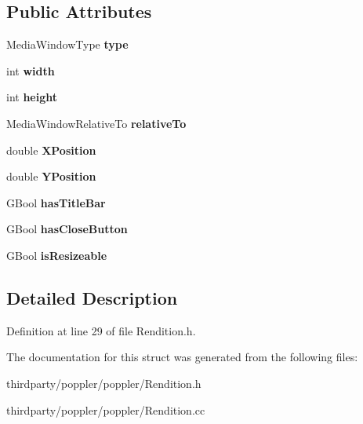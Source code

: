 \subsection*{Public Attributes}
\begin{DoxyCompactItemize}
\item 
\mbox{\label{struct_media_window_parameters_a85ac5f480f249175847a85b872445b65}} 
Media\+Window\+Type {\bfseries type}
\item 
\mbox{\label{struct_media_window_parameters_ae7613ce69196eadf0e752c496af974f4}} 
int {\bfseries width}
\item 
\mbox{\label{struct_media_window_parameters_aa742667f25571b63e410b6a315282a33}} 
int {\bfseries height}
\item 
\mbox{\label{struct_media_window_parameters_ab625857aeb8f04565dff59e7b7b7fefa}} 
Media\+Window\+Relative\+To {\bfseries relative\+To}
\item 
\mbox{\label{struct_media_window_parameters_a01684636750946f317812bad8613edfd}} 
double {\bfseries X\+Position}
\item 
\mbox{\label{struct_media_window_parameters_a324f12d577f6d82d6aecaf1e67b59ecc}} 
double {\bfseries Y\+Position}
\item 
\mbox{\label{struct_media_window_parameters_a7537b6d061b913da89dd2f53e5583a09}} 
G\+Bool {\bfseries has\+Title\+Bar}
\item 
\mbox{\label{struct_media_window_parameters_ab53d3abbe80e7a4732d2623823f55072}} 
G\+Bool {\bfseries has\+Close\+Button}
\item 
\mbox{\label{struct_media_window_parameters_a70c965be9fbbc709c1c3ae33ed19c47f}} 
G\+Bool {\bfseries is\+Resizeable}
\end{DoxyCompactItemize}


\subsection{Detailed Description}


Definition at line 29 of file Rendition.\+h.



The documentation for this struct was generated from the following files\+:\begin{DoxyCompactItemize}
\item 
thirdparty/poppler/poppler/Rendition.\+h\item 
thirdparty/poppler/poppler/Rendition.\+cc\end{DoxyCompactItemize}
